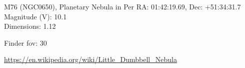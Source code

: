 \begin{block}{M76 (NGC0650), Planetary Nebula in Per}
    RA: 01:42:19.69, Dec: +51:34:31.7 \\ 
    Magnitude (V): 10.1 \\ 
    Dimensions: 1.12 

    Finder fov: 30 

    \url{https://en.wikipedia.org/wiki/Little_Dumbbell_Nebula} 
\end{block}
